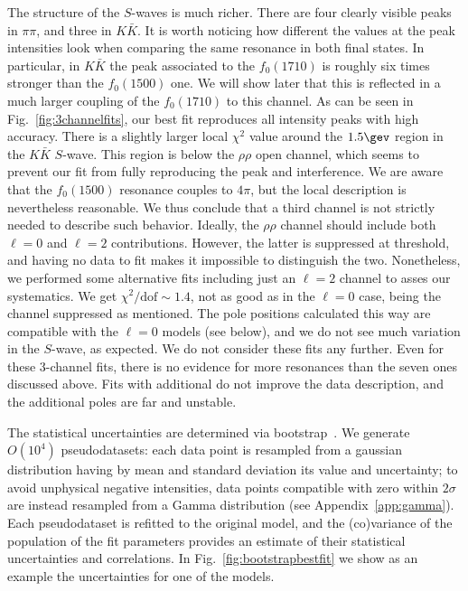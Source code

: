 The structure of the $S$-waves is much richer. There are four clearly visible peaks in $\pi \pi$, and three  in $K \bar K$. It is worth noticing how different the values at the peak intensities look when comparing the same resonance in both final states. In particular, in $K \bar K$ the peak associated to the $f_0(1710)$ is roughly six times stronger than the $f_0(1500)$ one. We will show later that this is reflected in a much larger coupling of the $f_0(1710)$ to this channel. As can be seen in Fig.~\ref{fig:3channelfits}, 
our best fit reproduces all intensity peaks with high accuracy. There is a slightly larger local $\chi^2$ value around the $1.5\gev$ region in the $K \bar K$ $S$-wave. This region is below the $\rho\rho$ open channel, which seems to prevent our fit from fully reproducing the peak and interference. We are aware that the $f_0(1500)$ resonance couples to $4\pi$, but the local description is nevertheless reasonable. We thus conclude that a third channel is not strictly needed to describe such behavior. Ideally, the $\rho \rho$ channel should include  both $\ell =0$ and $\ell =2$  contributions. However, the latter is suppressed at threshold, and having no data to fit makes it impossible to distinguish the two. Nonetheless, we performed some alternative fits including just an $\ell =2$ channel to asses our systematics. We get $\chi^2/\text{dof}\sim 1.4$, not as good as in the $\ell =0$ case, being the channel suppressed as  mentioned. The pole positions calculated this way are compatible with the $\ell =0$ models (see below), and we do not see much variation in the $S$-wave, as expected. We do not consider these fits any further.
Even for these 3-channel fits, there is no evidence for more resonances than the 
seven ones  discussed above. Fits with additional \KCDD do not improve the data description, and the additional poles are far and unstable. 

The statistical uncertainties are determined via bootstrap~\cite{recipes,EfroTibs93,Landay:2016cjw}. We generate $O(10^4)$
pseudodatasets: each data point is resampled from a gaussian distribution having by mean and standard deviation its value and uncertainty; to avoid unphysical negative intensities, data points compatible with zero within $2\sigma$ are instead resampled from a Gamma distribution (see Appendix~\ref{app:gamma}). Each 
pseudodataset is refitted to the original model, and the (co)variance of the population of the fit parameters provides an estimate of their statistical uncertainties and correlations. In Fig.~\ref{fig:bootstrapbestfit} we show as an example the uncertainties for one of the models. 
